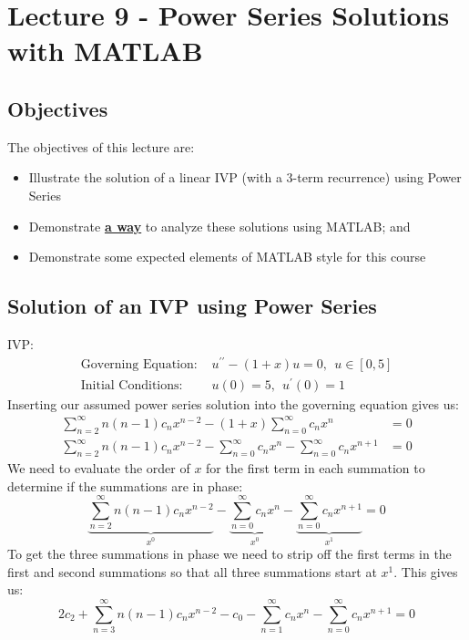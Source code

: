 \chapter{Lecture 9 - Power Series Solutions with MATLAB}
\label{ch:lec9}
\section{Objectives}
The objectives of this lecture are:
\begin{itemize}
\item Illustrate the solution of a linear IVP (with a 3-term recurrence) using Power Series
\item Demonstrate \textbf\underline{a way} to analyze these solutions using MATLAB; and
\item Demonstrate some expected elements of MATLAB style for this course
\end{itemize}

\section{Solution of an IVP using Power Series}

 IVP:
\begin{align*}
\text{Governing Equation:   }& u^{\prime \prime}-(1+x)u = 0, \ \ u\in[0,5]\\
\text{Initial Conditions:   }& u(0) = 5, \ \ u^{\prime}(0) = 1
\end{align*}
Inserting our assumed power series solution into the governing equation gives us:
\begin{align*}
\sum\limits_{n=2}^{\infty}n(n-1)c_nx^{n-2} - (1+x)\sum\limits_{n=0}^{\infty}c_nx^n &= 0 \\
\sum\limits_{n=2}^{\infty}n(n-1)c_nx^{n-2} - \sum\limits_{n=0}^{\infty}c_nx^{n} - \sum\limits_{n=0}^{\infty}c_nx^{n+1} &= 0
\end{align*}
\noindent We need to evaluate the order of $x$ for the first term in each summation to determine if the summations are in phase:
\begin{equation*}
\underbrace{\sum\limits_{n=2}^{\infty}n(n-1)c_nx^{n-2}}_{x^0} - \underbrace{\sum\limits_{n=0}^{\infty}c_nx^{n}}_{x^0} - \underbrace{\sum\limits_{n=0}^{\infty}c_nx^{n+1}}_{x^1} = 0
\end{equation*}
To get the three summations in phase we need to strip off the first terms in the first and second summations so that all three summations start at $x^{1}$.  This gives us:
\begin{equation*}
2c_2 + \sum\limits_{n=3}^{\infty}n(n-1)c_nx^{n-2} - c_0 - \sum\limits_{n=1}^{\infty} c_nx^n -\sum\limits_{n=0}^{\infty}c_nx^{n+1} = 0
\end{equation*}

